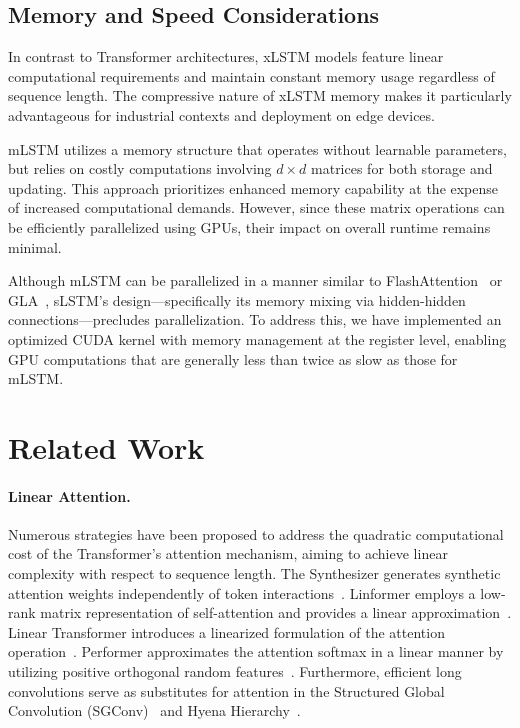 \subsection{Memory and Speed Considerations}

In contrast to Transformer architectures, xLSTM models feature linear computational requirements and maintain constant memory usage regardless of sequence length. The compressive nature of xLSTM memory makes it particularly advantageous for industrial contexts and deployment on edge devices.

mLSTM utilizes a memory structure that operates without learnable parameters, but relies on costly computations involving $d \times d$ matrices for both storage and updating. This approach prioritizes enhanced memory capability at the expense of increased computational demands. However, since these matrix operations can be efficiently parallelized using GPUs, their impact on overall runtime remains minimal.

Although mLSTM can be parallelized in a manner similar to FlashAttention~\citep{Dao:22,Dao:23} or GLA~\citep{Yang:23arxiv}, sLSTM's design—specifically its memory mixing via hidden-hidden connections—precludes parallelization. To address this, we have implemented an optimized CUDA kernel with memory management at the register level, enabling GPU computations that are generally less than twice as slow as those for mLSTM.

\section{Related Work}
\label{sec:related}

\paragraph{Linear Attention.} Numerous strategies have been proposed to address the quadratic computational cost of the Transformer's attention mechanism, aiming to achieve linear complexity with respect to sequence length. The Synthesizer generates synthetic attention weights independently of token interactions~\citep{Tay:20arxiv}. Linformer employs a low-rank matrix representation of self-attention and provides a linear approximation~\citep{Wang:20arxiv}. Linear Transformer introduces a linearized formulation of the attention operation~\citep{Katharopoulos:20}. Performer approximates the attention softmax in a linear manner by utilizing positive orthogonal random features~\citep{Choromanski:21}. Furthermore, efficient long convolutions serve as substitutes for attention in the Structured Global Convolution (SGConv)~\citep{Li:22} and Hyena Hierarchy~\citep{Poli:23}.

